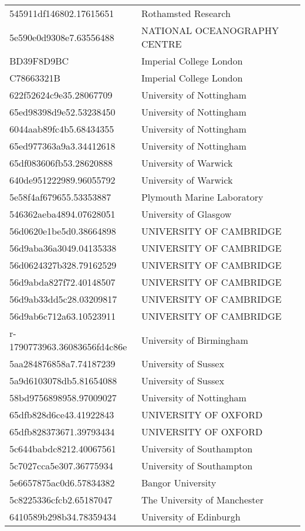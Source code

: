 \begin{tabular}{ll}
545911df146802.17615651 & Rothamsted Research \\
5e590e0d9308e7.63556488 & NATIONAL OCEANOGRAPHY CENTRE \\
BD39F8D9BC & Imperial College London \\
C78663321B & Imperial College London \\
622f52624c9e35.28067709 & University of Nottingham \\
65ed98398d9e52.53238450 & University of Nottingham \\
6044aab89fc4b5.68434355 & University of Nottingham \\
65ed977363a9a3.34412618 & University of Nottingham \\
65df083606fb53.28620888 & University of Warwick \\
640de951222989.96055792 & University of Warwick \\
5e58f4af679655.53353887 & Plymouth Marine Laboratory \\
546362aeba4894.07628051 & University of Glasgow \\
56d0620e1be5d0.38664898 & UNIVERSITY OF CAMBRIDGE \\
56d9aba36a3049.04135338 & UNIVERSITY OF CAMBRIDGE \\
56d0624327b328.79162529 & UNIVERSITY OF CAMBRIDGE \\
56d9abda827f72.40148507 & UNIVERSITY OF CAMBRIDGE \\
56d9ab33dd5c28.03209817 & UNIVERSITY OF CAMBRIDGE \\
56d9ab6c712a63.10523911 & UNIVERSITY OF CAMBRIDGE \\
r-1790773963.36083656fd4c86e & University of Birmingham \\
5aa284876858a7.74187239 & University of Sussex \\
5a9d6103078db5.81654088 & University of Sussex \\
58bd9756898958.97009027 & University of Nottingham \\
65dfb828d6ce43.41922843 & UNIVERSITY OF OXFORD \\
65dfb828373671.39793434 & UNIVERSITY OF OXFORD \\
5c644babdc8212.40067561 & University of Southampton \\
5c7027cca5e307.36775934 & University of Southampton \\
5e6657875ac0d6.57834382 & Bangor University \\
5c8225336cfcb2.65187047 & The University of Manchester \\
6410589b298b34.78359434 & University of Edinburgh \\

\end{tabular}
